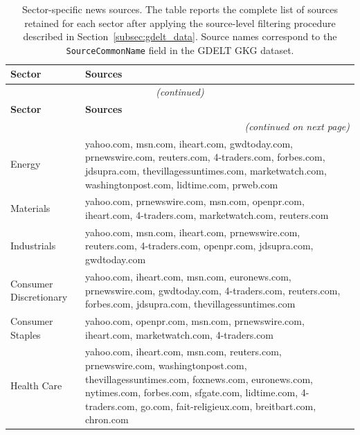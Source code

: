 \begin{longtable}{@{}p{2.5cm} | p{12.6cm}@{}}
\caption{Sector-specific news sources. The table reports the complete list of sources retained for each sector after applying the source-level filtering procedure described in Section~\ref{subsec:gdelt_data}. Source names correspond to the \texttt{SourceCommonName} field in the GDELT GKG dataset.}
\label{tab:per_sector_filter_sources} \\

\toprule
\textbf{Sector} & \textbf{Sources} \\
\midrule
\endfirsthead

\multicolumn{2}{c}{\footnotesize\textit{(continued)}} \\
\toprule
\textbf{Sector} & \textbf{Sources} \\
\midrule
\endhead

\midrule
\multicolumn{2}{r}{\footnotesize\textit{(continued on next page)}} \\
\endfoot

\bottomrule
\endlastfoot

Energy
& yahoo.com, msn.com, iheart.com, gwdtoday.com, prnewswire.com, reuters.com, 4-traders.com, forbes.com, jdsupra.com, thevillagessuntimes.com, marketwatch.com, washingtonpost.com, lidtime.com, prweb.com \\

Materials
& yahoo.com, prnewswire.com, msn.com, openpr.com, iheart.com, 4-traders.com, marketwatch.com, reuters.com \\

Industrials
& yahoo.com, msn.com, iheart.com, prnewswire.com, reuters.com, 4-traders.com, openpr.com, jdsupra.com, gwdtoday.com \\

Consumer $\ $ Discretionary
& yahoo.com, iheart.com, msn.com, euronews.com, prnewswire.com, gwdtoday.com, 4-traders.com, reuters.com, forbes.com, jdsupra.com, thevillagessuntimes.com \\

Consumer $\ $ Staples
& yahoo.com, openpr.com, msn.com, prnewswire.com, iheart.com, marketwatch.com, 4-traders.com \\

Health Care
& yahoo.com, iheart.com, msn.com, reuters.com, prnewswire.com, washingtonpost.com, thevillagessuntimes.com, foxnews.com, euronews.com, nytimes.com, forbes.com, sfgate.com, lidtime.com, 4-traders.com, go.com, fait-religieux.com, breitbart.com, chron.com \\


\end{longtable}
